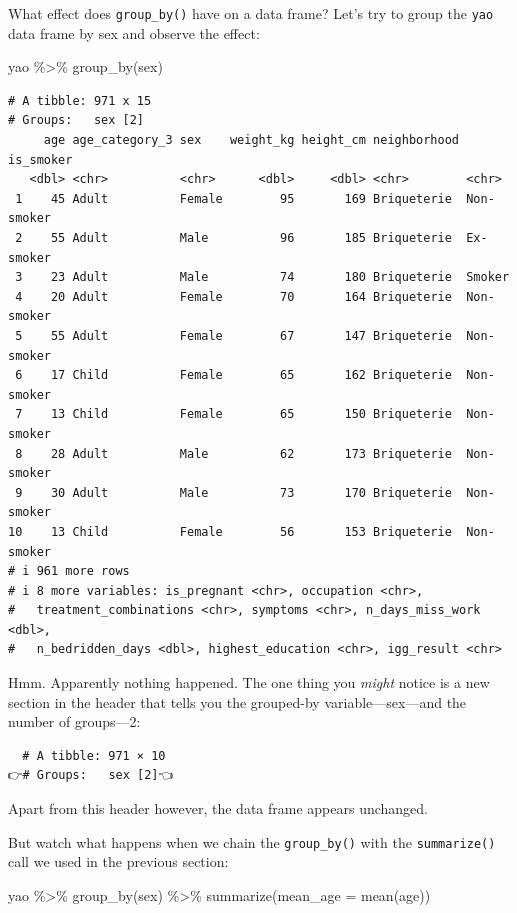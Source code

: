 \documentclass[
  letterpaper,
  DIV=11,
  numbers=noendperiod]{scrreprt}
\newenvironment{Shaded}{\begin{snugshade}}{\end{snugshade}}
\newcommand{\AttributeTok}[1]{\textcolor[rgb]{0.40,0.45,0.13}{#1}}
\newcommand{\FunctionTok}[1]{\textcolor[rgb]{0.28,0.35,0.67}{#1}}
\newcommand{\NormalTok}[1]{\textcolor[rgb]{0.00,0.23,0.31}{#1}}
\newcommand{\SpecialCharTok}[1]{\textcolor[rgb]{0.37,0.37,0.37}{#1}}
\begin{document}
What effect does \texttt{group\_by()} have on a data frame? Let's try to
group the \texttt{yao} data frame by sex and observe the effect:

\begin{Shaded}
\begin{Highlighting}[]
\NormalTok{yao }\SpecialCharTok{\%\textgreater{}\%} 
  \FunctionTok{group\_by}\NormalTok{(sex)}
\end{Highlighting}
\end{Shaded}

\begin{verbatim}
# A tibble: 971 x 15
# Groups:   sex [2]
     age age_category_3 sex    weight_kg height_cm neighborhood is_smoker 
   <dbl> <chr>          <chr>      <dbl>     <dbl> <chr>        <chr>     
 1    45 Adult          Female        95       169 Briqueterie  Non-smoker
 2    55 Adult          Male          96       185 Briqueterie  Ex-smoker 
 3    23 Adult          Male          74       180 Briqueterie  Smoker    
 4    20 Adult          Female        70       164 Briqueterie  Non-smoker
 5    55 Adult          Female        67       147 Briqueterie  Non-smoker
 6    17 Child          Female        65       162 Briqueterie  Non-smoker
 7    13 Child          Female        65       150 Briqueterie  Non-smoker
 8    28 Adult          Male          62       173 Briqueterie  Non-smoker
 9    30 Adult          Male          73       170 Briqueterie  Non-smoker
10    13 Child          Female        56       153 Briqueterie  Non-smoker
# i 961 more rows
# i 8 more variables: is_pregnant <chr>, occupation <chr>,
#   treatment_combinations <chr>, symptoms <chr>, n_days_miss_work <dbl>,
#   n_bedridden_days <dbl>, highest_education <chr>, igg_result <chr>
\end{verbatim}

Hmm. Apparently nothing happened. The one thing you \emph{might} notice
is a new section in the header that tells you the grouped-by
variable---sex---and the number of groups---2:

\begin{verbatim}
  # A tibble: 971 × 10
👉# Groups:   sex [2]👈
\end{verbatim}

Apart from this header however, the data frame appears unchanged.

But watch what happens when we chain the \texttt{group\_by()} with the
\texttt{summarize()} call we used in the previous section:

\begin{Shaded}
\begin{Highlighting}[]
\NormalTok{yao }\SpecialCharTok{\%\textgreater{}\%} 
  \FunctionTok{group\_by}\NormalTok{(sex) }\SpecialCharTok{\%\textgreater{}\%} 
  \FunctionTok{summarize}\NormalTok{(}\AttributeTok{mean\_age =} \FunctionTok{mean}\NormalTok{(age))}
\end{Highlighting}
\end{Shaded}
\end{document}
